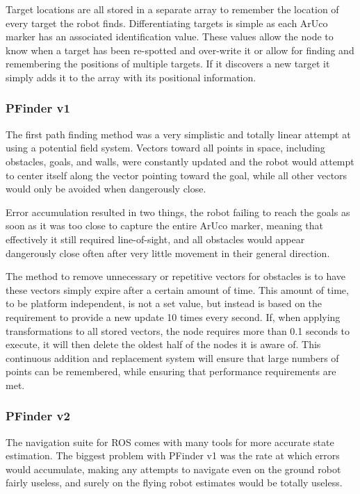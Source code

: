 \documentclass{article}[12]
\begin{document}
 Target locations are all stored in a separate array to remember the location of every target the robot finds. Differentiating targets is simple as each ArUco marker has an associated identification value. These values allow the node to know when a target has been re-spotted and over-write it or allow for finding and remembering the positions of multiple targets. If it discovers a new target it simply adds it to the array with its positional information.
 
 	\subsubsection{PFinder v1}
 
 	The first path finding method was a very simplistic and totally linear attempt at using a potential field system. Vectors toward all points in space, including obstacles, goals, and walls, were constantly updated and the robot would attempt to center itself along the vector pointing toward the goal, while all other vectors would only be avoided when dangerously close.
 
 	Error accumulation resulted in two things, the robot failing to reach the goals as soon as it was too close to capture the entire ArUco marker, meaning that effectively it still required line-of-sight, and all obstacles would appear dangerously close often after very little movement in their general direction. 


	The method to remove unnecessary or repetitive vectors for obstacles is to have these vectors simply expire after a certain amount of time. This amount of time, to be platform independent, is not a set value, but instead is based on the requirement to provide a new update 10 times every second. If, when applying transformations to all stored vectors, the node requires more than 0.1 seconds to execute, it will then delete the oldest half of the nodes it is aware of. This continuous addition and replacement system will ensure that large numbers of points can be remembered, while ensuring that performance requirements are met.
	
	\subsubsection{PFinder v2}
	
	The navigation suite for ROS comes with many tools for more accurate state estimation. The biggest problem with PFinder v1 was the rate at which errors would accumulate, making any attempts to navigate even on the ground robot fairly useless, and surely on the flying robot estimates would be totally useless.
	
\end{document}
